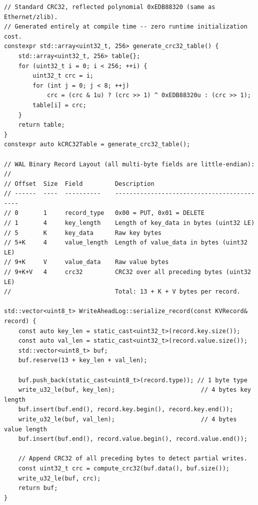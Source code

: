 \documentclass[11pt,a4paper]{article}
\begin{document}
\begin{lstlisting}[style=cpp, caption={Compile-Time CRC32 Table and WAL Binary Format: \texttt{src/wal.cpp}}]
// Standard CRC32, reflected polynomial 0xEDB88320 (same as Ethernet/zlib).
// Generated entirely at compile time -- zero runtime initialization cost.
constexpr std::array<uint32_t, 256> generate_crc32_table() {
    std::array<uint32_t, 256> table{};
    for (uint32_t i = 0; i < 256; ++i) {
        uint32_t crc = i;
        for (int j = 0; j < 8; ++j)
            crc = (crc & 1u) ? (crc >> 1) ^ 0xEDB88320u : (crc >> 1);
        table[i] = crc;
    }
    return table;
}
constexpr auto kCRC32Table = generate_crc32_table();

// WAL Binary Record Layout (all multi-byte fields are little-endian):
//
// Offset  Size  Field         Description
// ------  ----  ----------    -------------------------------------------
// 0       1     record_type   0x00 = PUT, 0x01 = DELETE
// 1       4     key_length    Length of key_data in bytes (uint32 LE)
// 5       K     key_data      Raw key bytes
// 5+K     4     value_length  Length of value_data in bytes (uint32 LE)
// 9+K     V     value_data    Raw value bytes
// 9+K+V   4     crc32         CRC32 over all preceding bytes (uint32 LE)
//                             Total: 13 + K + V bytes per record.

std::vector<uint8_t> WriteAheadLog::serialize_record(const KVRecord& record) {
    const auto key_len = static_cast<uint32_t>(record.key.size());
    const auto val_len = static_cast<uint32_t>(record.value.size());
    std::vector<uint8_t> buf;
    buf.reserve(13 + key_len + val_len);

    buf.push_back(static_cast<uint8_t>(record.type)); // 1 byte type
    write_u32_le(buf, key_len);                        // 4 bytes key length
    buf.insert(buf.end(), record.key.begin(), record.key.end());
    write_u32_le(buf, val_len);                        // 4 bytes value length
    buf.insert(buf.end(), record.value.begin(), record.value.end());

    // Append CRC32 of all preceding bytes to detect partial writes.
    const uint32_t crc = compute_crc32(buf.data(), buf.size());
    write_u32_le(buf, crc);
    return buf;
}
\end{lstlisting}
\end{document}
